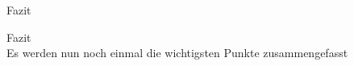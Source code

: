 
\begin{frame}[c]{Fazit}

  \begin{center}
    Fazit\\
    Es werden nun noch einmal die wichtigsten Punkte zusammengefasst
  \end{center}

\end{frame}
